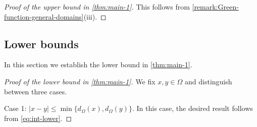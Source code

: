 \documentclass[11pt,reqno]{amsart}
\theoremstyle{plain}
\theoremstyle{definition}
\numberwithin{equation}{section}
\newcommand{\1}{\mathbbm{1}}
\begin{document}
\begin{proof}[Proof of the upper bound in \autoref{thm:main-1}]
This follows from \autoref{remark:Green-function-general-domains}(iii).
\end{proof}

\subsection{Lower bounds}

In this section we establish the lower bound in \autoref{thm:main-1}.

\begin{proof}[Proof of the lower bound in \autoref{thm:main-1}]
We fix $x,y \in \Omega$ and distinguish between three cases.

Case 1: $|x-y| \le \min\{ d_{\Omega}(x) , d_{\Omega}(y) \}$. In this case, the desired result follows from \eqref{eq:int-lower}. 


\end{proof}
\end{document}

